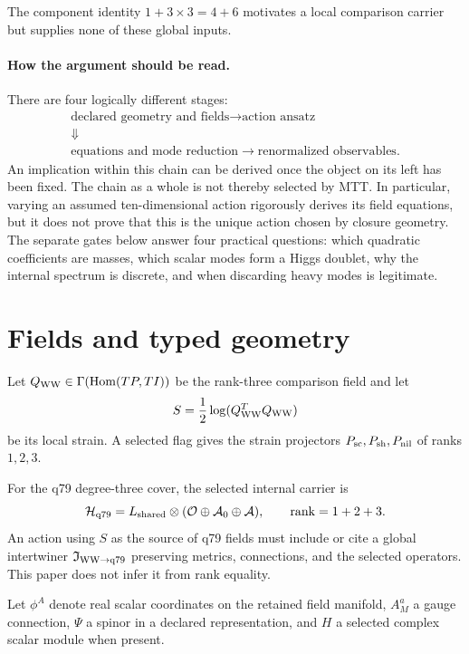 \documentclass[11pt]{article}
\begin{document}
The component identity $1+3\times3=4+6$ motivates a local comparison carrier
but supplies none of these global inputs.

\paragraph{How the argument should be read.}
There are four logically different stages:
\[
\begin{gathered}
\boxed{\text{declared geometry and fields}}
\longrightarrow
\boxed{\text{action ansatz}}\\
\Downarrow\\[-1mm]
\boxed{\text{equations and mode reduction}}
\longrightarrow
\boxed{\text{renormalized observables}} .
\end{gathered}
\]
An implication within this chain can be derived once the object on its left
has been fixed.  The chain as a whole is not thereby selected by MTT.  In
particular, varying an assumed ten-dimensional action rigorously derives its
field equations, but it does not prove that this is the unique action chosen
by closure geometry.  The separate gates below answer four practical
questions: which quadratic coefficients are masses, which scalar modes form a
Higgs doublet, why the internal spectrum is discrete, and when discarding
heavy modes is legitimate.

\section{Fields and typed geometry}

Let $Q_{\rm WW}\in\Gamma(\operatorname{Hom}(TP,TI))$ be the rank-three
comparison field and let
\[
 S=\frac12\log(Q_{\rm WW}^TQ_{\rm WW})
\]
be its local strain.  A selected flag gives the strain projectors
$P_{\rm sc},P_{\rm sh},P_{\rm nil}$ of ranks $1,2,3$.

For the q79 degree-three cover, the selected internal carrier is
\[
 \mathcal H_{\rm q79}
 =L_{\rm shared}\otimes
 (\mathcal O\oplus\mathcal A_0\oplus\mathcal A),
 \qquad \operatorname{rank}=1+2+3.
\]
An action using $S$ as the source of q79 fields must include or cite a global
intertwiner $\mathfrak I_{\rm WW\to q79}$ preserving metrics, connections, and
the selected operators.  This paper does not infer it from rank equality.

Let $\phi^A$ denote real scalar coordinates on the retained field manifold,
$A_M^a$ a gauge connection, $\Psi$ a spinor in a declared representation, and
$H$ a selected complex scalar module when present.
\end{document}
